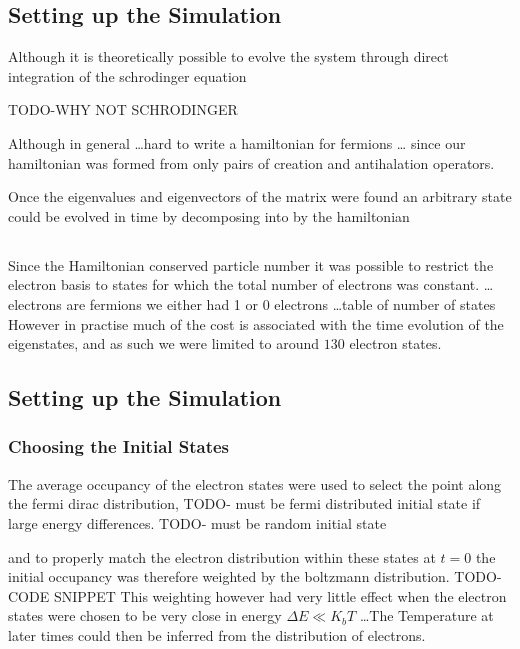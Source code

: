 
\subsection{Setting up the Simulation}

Although it is theoretically possible
to evolve the system through direct
integration of the schrodinger equation

TODO-WHY NOT SCHRODINGER

Although in general \ldots hard to write
a hamiltonian for fermions \ldots
since our hamiltonian was formed from only
pairs of creation and antihalation
operators.

Once the eigenvalues and eigenvectors of the
matrix were found an arbitrary state could
be evolved in time by decomposing into by the hamiltonian

\subsection{}
Since the Hamiltonian conserved particle number
it was possible to restrict the electron basis
to states for which the total number of electrons
was constant.
\ldots electrons are fermions we either had 1 or
0 electrons
\ldots table of number of states
However in practise much of the cost
is associated with the time evolution of
the eigenstates, and as such we were limited
to around \(130\) electron states.

\subsection{Setting up the Simulation}

\subsubsection{Choosing the Initial States}
The average occupancy of the electron states
were used to select the point along the fermi
dirac distribution,
TODO- must be fermi distributed initial state
if large energy differences.
TODO- must be random initial state

and to properly match
the electron distribution within these states
at \(t=0\) the initial occupancy was therefore weighted
by the boltzmann distribution.
TODO-CODE SNIPPET
This weighting however had very little
effect when the electron states were chosen
to be very close in energy \(\Delta E \ll K_b T\)
\ldots The Temperature
at later times could then be inferred from
the distribution of electrons.

